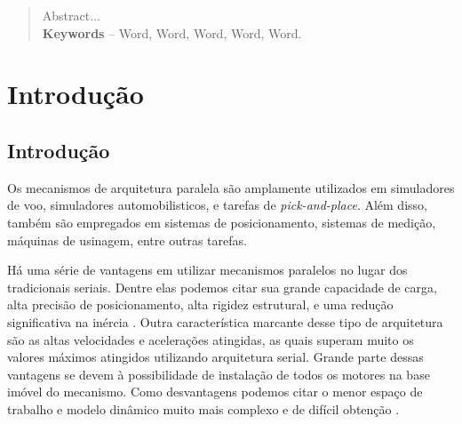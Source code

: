 \documentclass[]{politex}
\begin{document}
\begin{abstract}
Abstract...
%
\\[3\baselineskip]
%
\textbf{Keywords} -- Word, Word, Word, Word, Word.
\end{abstract}


\listadefiguras
\listadetabelas

\sumario




\part{Introdução}
	
\chapter{Introdução}

Os mecanismos de arquitetura paralela são amplamente utilizados em simuladores de voo, simuladores automobilisticos, e tarefas de {\em pick-and-place}. Além disso, também são empregados em sistemas de posicionamento, sistemas de medição, máquinas de usinagem, entre outras tarefas. 

Há uma série de vantagens em utilizar mecanismos paralelos no lugar dos tradicionais seriais. Dentre elas podemos citar sua grande capacidade de carga, alta precisão de posicionamento, alta rigidez estrutural, e uma redução significativa na inércia \cite{Cheng, Khalil, Merlet2002, Tsai}. Outra característica marcante desse tipo de arquitetura são as altas velocidades e acelerações atingidas, as quais superam muito os valores máximos atingidos utilizando arquitetura serial. Grande parte dessas vantagens se devem à possibilidade de instalação de todos os motores na base imóvel do mecanismo. Como desvantagens podemos citar o menor espaço de trabalho e modelo dinâmico muito mais complexo e de difícil obtenção \cite{Rynaldo, Merlet2002}.
\end{document}
